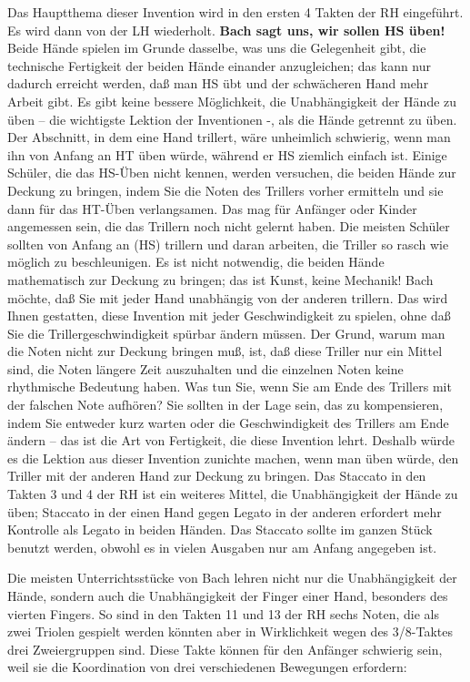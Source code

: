 Das Hauptthema dieser Invention wird in den ersten 4 Takten der RH eingeführt.
Es wird dann von der LH wiederholt.
\textbf{Bach sagt uns, wir sollen HS üben!}
Beide Hände spielen im Grunde dasselbe, was uns die Gelegenheit gibt, die technische Fertigkeit der beiden Hände einander anzugleichen; das kann nur dadurch erreicht werden, daß man HS übt und der schwächeren Hand mehr Arbeit gibt.
Es gibt keine bessere Möglichkeit, die Unabhängigkeit der Hände zu üben -- die wichtigste Lektion der Inventionen -, als die Hände getrennt zu üben.
Der Abschnitt, in dem eine Hand trillert, wäre unheimlich schwierig, wenn man ihn von Anfang an HT üben würde, während er HS ziemlich einfach ist.
Einige Schüler, die das HS-Üben nicht kennen, werden versuchen, die beiden Hände zur Deckung zu bringen, indem Sie die Noten des Trillers vorher ermitteln und sie dann für das HT-Üben verlangsamen.
Das mag für Anfänger oder Kinder angemessen sein, die das Trillern noch nicht gelernt haben.
Die meisten Schüler sollten von Anfang an (HS) trillern und daran arbeiten, die Triller so rasch wie möglich zu beschleunigen.
Es ist nicht notwendig, die beiden Hände mathematisch zur Deckung zu bringen; das ist Kunst, keine Mechanik!
Bach möchte, daß Sie mit jeder Hand unabhängig von der anderen trillern.
Das wird Ihnen gestatten, diese Invention mit jeder Geschwindigkeit zu spielen, ohne daß Sie die Trillergeschwindigkeit spürbar ändern müssen.
Der Grund, warum man die Noten nicht zur Deckung bringen muß, ist, daß diese Triller nur ein Mittel sind, die Noten längere Zeit auszuhalten und die einzelnen Noten keine rhythmische Bedeutung haben.
Was tun Sie, wenn Sie am Ende des Trillers mit der falschen Note aufhören?
Sie sollten in der Lage sein, das zu kompensieren, indem Sie entweder kurz warten oder die Geschwindigkeit des Trillers am Ende ändern -- das ist die Art von Fertigkeit, die diese Invention lehrt.
Deshalb würde es die Lektion aus dieser Invention zunichte machen, wenn man üben würde, den Triller mit der anderen Hand zur Deckung zu bringen.
Das Staccato in den Takten 3 und 4 der RH ist ein weiteres Mittel, die Unabhängigkeit der Hände zu üben; Staccato in der einen Hand gegen Legato in der anderen erfordert mehr Kontrolle als Legato in beiden Händen.
Das Staccato sollte im ganzen Stück benutzt werden, obwohl es in vielen Ausgaben nur am Anfang angegeben ist.

Die meisten Unterrichtsstücke von Bach lehren nicht nur die Unabhängigkeit der Hände, sondern auch die Unabhängigkeit der Finger einer Hand, besonders des vierten Fingers.
So sind in den Takten 11 und 13 der RH sechs Noten, die als zwei Triolen gespielt werden könnten aber in Wirklichkeit wegen des 3/8-Taktes drei Zweiergruppen sind.
Diese Takte können für den Anfänger schwierig sein, weil sie die Koordination von drei verschiedenen Bewegungen erfordern:

